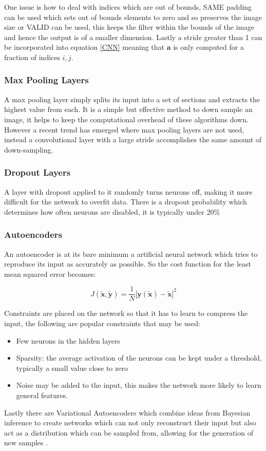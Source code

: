 \documentclass[9pt]{article} \usepackage{amsmath, amsthm, amssymb}
\begin{document}
One issue is how to deal with indices which are out of bounds, SAME padding can be used which sets out of bounds 
elements to zero and so preserves the image size or VALID can be used, this keeps the filter within the bounds of the
image and hence the output is of a smaller dimension. Lastly a stride greater than 1 can be incorporated into equation
\ref{CNN} meaning that $\mathbf{a}$ is only computed for a fraction of indices $i,j$.
\subsubsection*{Max Pooling Layers}
A max pooling layer simply splits its input into a set of sections and extracts
the highest value from each. It is a simple but effective method to down sample
an image, it helps to keep the computational overhead of these algorithms
down. However a recent trend \cite{Springenberg2015} has emerged where max pooling
layers are not used, instead a convolutional layer with a large stride accomplishes
the same amount of down-sampling.
\subsubsection*{Dropout Layers}
A layer with dropout applied to it randomly turns neurons off, making it more
difficult for the network to overfit data. There is a dropout probability
which determines how often neurons are disabled, it is typically under 20\%
\subsubsection{Autoencoders}
An autoencoder is at its bare minimum a artificial neural network which tries
to reproduce its input as accurately as possible. So the cost function for the
least mean squared error becomes:

\begin{equation}
    J(\tilde{\mathbf{x}},\tilde{\mathbf{y}}) = \frac{1}{N}\left |\mathbf{y}(\tilde{\mathbf{x}})-\tilde{\mathbf{x}}\right | ^2
\end{equation}

Constraints are
placed on the network so that it has to learn to compress the input, the following
are popular constraints that may be used:
\begin{itemize}
    \item Few neurons in the hidden layers
    \item Sparsity: the average activation of the neurons can be kept under a
    threshold, typically a small value close to zero \cite{autong}
    \item Noise may be added to the input, this makes the network more likely
    to learn general features.
\end{itemize}
Lastly there are Variational Autoencoders which combine ideas from Bayesian inference
to create networks which can not only reconstruct their input but also act as a
distribution which can be sampled from, allowing for the generation of new samples \cite{Kingma2013}.
\end{document}
